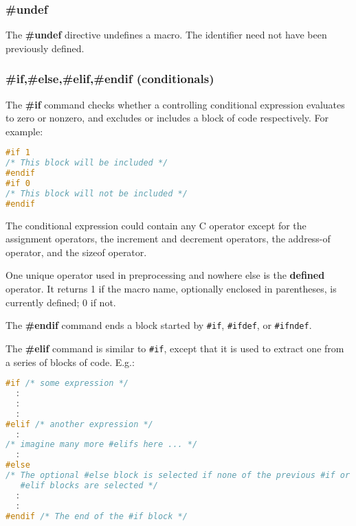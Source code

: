 \subsubsection{\#undef}
The \textbf{\#undef} directive undefines a macro. The identifier need not have
been previously defined.

\subsubsection{\#if,\#else,\#elif,\#endif (conditionals)}
The \textbf{\#if} command checks whether a controlling conditional expression
evaluates to zero or nonzero, and excludes or includes a block of code
respectively. For example:
\lstset{basicstyle=\scriptsize, numbers=left, captionpos=b, tabsize=4}
\begin{lstlisting}[caption=Section \thesection listing \arabic{preprocnt},language={C},
breaklines=true,xleftmargin=15pt, label=lst:section\thesection listing\arabic{preprocnt}]
#if 1
/* This block will be included */
#endif
#if 0
/* This block will not be included */
#endif
\end{lstlisting}

The conditional expression could contain any C operator except for the
assignment operators, the increment and decrement operators, the address-of
operator, and the sizeof operator.

One unique operator used in preprocessing and nowhere else is the
\textbf{defined} operator. It returns 1 if the macro name, optionally enclosed
in parentheses, is currently defined; 0 if not.

The \textbf{\#endif} command ends a block started by \texttt{\#if},
\texttt{\#ifdef}, or \texttt{\#ifndef}.

The \textbf{\#elif} command is similar to \texttt{\#if}, except that it is used
to extract one from a series of blocks of code. E.g.:
\lstset{basicstyle=\scriptsize, numbers=left, captionpos=b, tabsize=4}
\begin{lstlisting}[caption=Section \thesection listing \arabic{preprocnt},language={C},
breaklines=true,xleftmargin=15pt, label=lst:section\thesection listing\arabic{preprocnt}]
#if /* some expression */
  :
  :
  :
#elif /* another expression */
  :
/* imagine many more #elifs here ... */
  :
#else
/* The optional #else block is selected if none of the previous #if or
   #elif blocks are selected */
  :
  :
#endif /* The end of the #if block */
\end{lstlisting}


